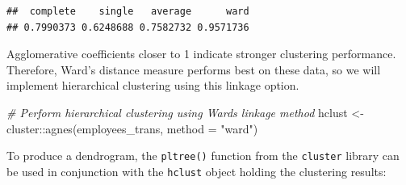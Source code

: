 \documentclass[
]{book}
\newenvironment{Shaded}{\begin{snugshade}}{\end{snugshade}}
\newcommand{\AttributeTok}[1]{\textcolor[rgb]{0.77,0.63,0.00}{#1}}
\newcommand{\CommentTok}[1]{\textcolor[rgb]{0.56,0.35,0.01}{\textit{#1}}}
\newcommand{\ControlFlowTok}[1]{\textcolor[rgb]{0.13,0.29,0.53}{\textbf{#1}}}
\newcommand{\FunctionTok}[1]{\textcolor[rgb]{0.00,0.00,0.00}{#1}}
\newcommand{\NormalTok}[1]{#1}
\newcommand{\OtherTok}[1]{\textcolor[rgb]{0.56,0.35,0.01}{#1}}
\newcommand{\SpecialCharTok}[1]{\textcolor[rgb]{0.00,0.00,0.00}{#1}}
\newcommand{\StringTok}[1]{\textcolor[rgb]{0.31,0.60,0.02}{#1}}
\begin{document}
\begin{Shaded}
\end{Shaded}

\begin{verbatim}
##  complete    single   average      ward 
## 0.7990373 0.6248688 0.7582732 0.9571736
\end{verbatim}

Agglomerative coefficients closer to 1 indicate stronger clustering performance. Therefore, Ward's distance measure performs best on these data, so we will implement hierarchical clustering using this linkage option.

\begin{Shaded}
\begin{Highlighting}[]
\CommentTok{\# Perform hierarchical clustering using Ward\textquotesingle{}s linkage method}
\NormalTok{hclust }\OtherTok{\textless{}{-}}\NormalTok{ cluster}\SpecialCharTok{::}\FunctionTok{agnes}\NormalTok{(employees\_trans, }\AttributeTok{method =} \StringTok{"ward"}\NormalTok{)}
\end{Highlighting}
\end{Shaded}

To produce a dendrogram, the \texttt{pltree()} function from the \texttt{cluster} library can be used in conjunction with the \texttt{hclust} object holding the clustering results:
\end{document}
